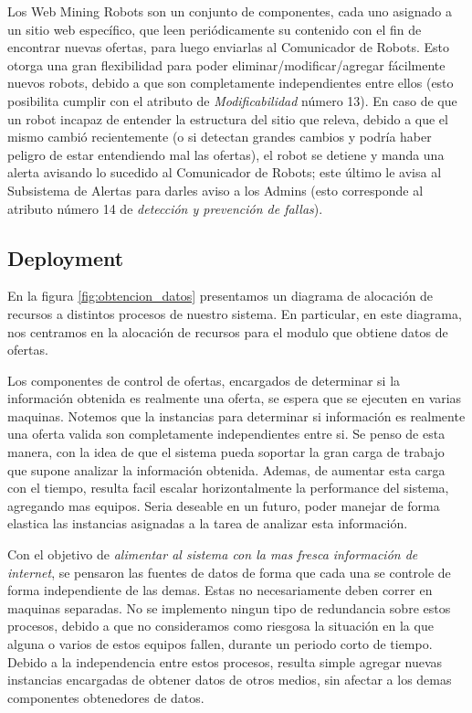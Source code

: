 Los \textsf{Web Mining Robots} son un conjunto de componentes, cada uno asignado a un sitio web específico, que leen periódicamente su contenido con el fin de encontrar nuevas ofertas, para luego enviarlas al \textsf{Comunicador de Robots}. Esto otorga una gran flexibilidad para poder eliminar/modificar/agregar fácilmente nuevos robots, debido a que son completamente independientes entre ellos (esto posibilita cumplir con el atributo de \emph{Modificabilidad} número 13). En caso de que un robot incapaz de entender la estructura del sitio que releva, debido a que el mismo cambió recientemente (o si detectan grandes cambios y podría haber peligro de estar entendiendo mal las ofertas), el robot se detiene y manda una alerta avisando lo sucedido al \textsf{Comunicador de Robots}; este último le avisa al \textsf{Subsistema de Alertas} para darles aviso a los Admins (esto corresponde al atributo número 14 de \emph{detección y prevención de fallas}).
\vspace{9pt}


\subsection{Deployment}

En la figura \ref{fig:obtencion_datos} presentamos un diagrama de alocación de recursos a distintos procesos de nuestro sistema. En particular, en este diagrama, nos centramos en la alocación de recursos para el modulo que obtiene datos de ofertas. 

Los componentes de control de ofertas, encargados de determinar si la información obtenida es realmente una oferta, se espera que se ejecuten en varias maquinas. Notemos que la instancias para determinar si información es realmente una oferta valida son completamente independientes entre si. Se penso de esta manera, con la idea de que el sistema pueda soportar la gran carga de trabajo que supone analizar la información obtenida. Ademas, de aumentar esta carga con el tiempo, resulta facil escalar horizontalmente la performance del sistema, agregando mas equipos. Seria deseable en un futuro, poder manejar de forma elastica las instancias asignadas a la tarea de analizar esta información.

Con el objetivo de \emph{alimentar al sistema con la mas fresca información de internet}, se pensaron las fuentes de datos de forma que cada una se controle de forma independiente de las demas. Estas no necesariamente deben correr en maquinas separadas. No se implemento ningun tipo de redundancia sobre estos procesos, debido a que no consideramos como riesgosa la situación en la que alguna o varios de estos equipos fallen, durante un periodo corto de tiempo. Debido a la independencia entre estos procesos, resulta simple agregar nuevas instancias encargadas de obtener datos de otros medios, sin afectar a los demas componentes obtenedores de datos.


